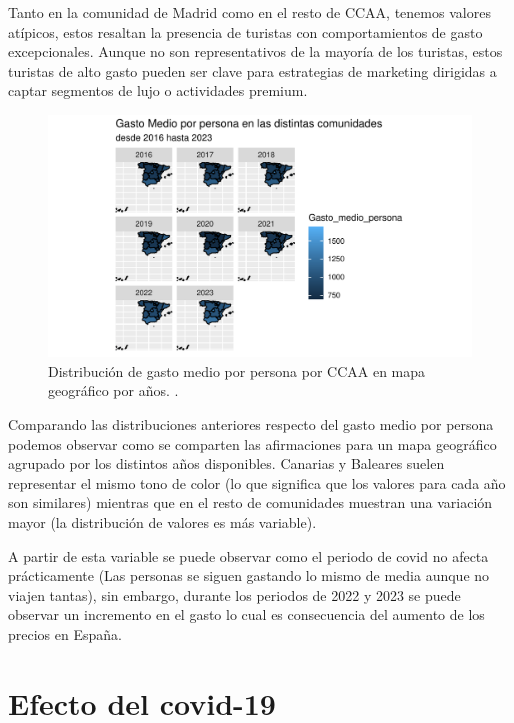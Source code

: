 \documentclass[data,article,submit,moreauthors,pdftex]{Definitions/mdpi}
\begin{document}
Tanto en la comunidad de Madrid como en el resto de CCAA, tenemos
valores atípicos, estos resaltan la presencia de turistas con
comportamientos de gasto excepcionales. Aunque no son representativos de
la mayoría de los turistas, estos turistas de alto gasto pueden ser
clave para estrategias de marketing dirigidas a captar segmentos de lujo
o actividades premium.

\begin{figure}[H]
\includegraphics{ProyectoAED2024_Rmd_files/figure-latex/unnamed-chunk-29-1} \caption{Distribución de gasto medio por persona por CCAA en mapa geográfico por años. .\label{fig:GeografGastoMedio}}\label{fig:unnamed-chunk-29}
\end{figure}

Comparando las distribuciones anteriores respecto del gasto medio por
persona podemos observar como se comparten las afirmaciones para un mapa
geográfico agrupado por los distintos años disponibles. Canarias y
Baleares suelen representar el mismo tono de color (lo que significa que
los valores para cada año son similares) mientras que en el resto de
comunidades muestran una variación mayor (la distribución de valores es
más variable).

A partir de esta variable se puede observar como el periodo de covid no
afecta prácticamente (Las personas se siguen gastando lo mismo de media
aunque no viajen tantas), sin embargo, durante los periodos de 2022 y
2023 se puede observar un incremento en el gasto lo cual es consecuencia
del aumento de los precios en España.

\hypertarget{efecto-del-covid-19}{%
\section{Efecto del covid-19}\label{efecto-del-covid-19}}
\end{document}
